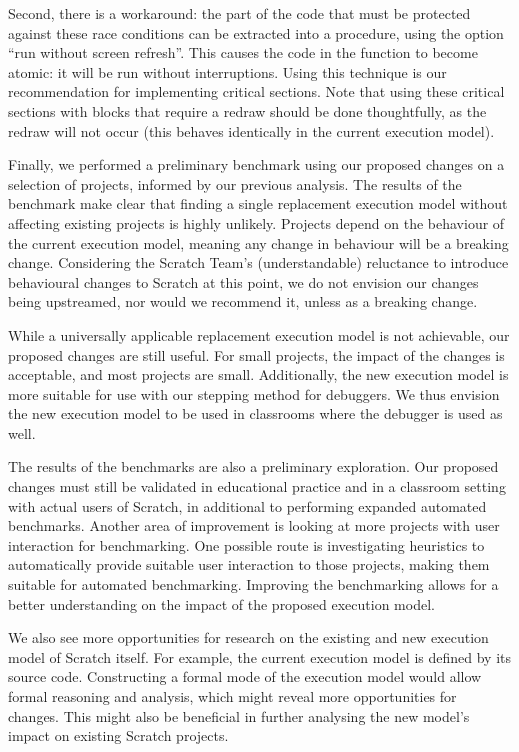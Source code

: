 \documentclass[../main]{subfiles}
\begin{document}
Second, there is a workaround: the part of the code that must be protected against these race conditions can be extracted into a procedure, using the option ``run without screen refresh''.
This causes the code in the function to become atomic: it will be run without interruptions.
Using this technique is our recommendation for implementing critical sections.
Note that using these critical sections with blocks that require a redraw should be done thoughtfully, as the redraw will not occur (this behaves identically in the current execution model).

Finally, we performed a preliminary benchmark using our proposed changes on a selection of projects, informed by our previous analysis.
The results of the benchmark make clear that finding a single replacement execution model without affecting existing projects is highly unlikely.
Projects depend on the behaviour of the current execution model, meaning any change in behaviour will be a breaking change.
Considering the Scratch Team's (understandable) reluctance to introduce behavioural changes to Scratch at this point, we do not envision our changes being upstreamed, nor would we recommend it,  unless as a breaking change.

While a universally applicable replacement execution model is not achievable, our proposed changes are still useful.
For small projects, the impact of the changes is acceptable, and most projects are small.
Additionally, the new execution model is more suitable for use with our stepping method for debuggers.
We thus envision the new execution model to be used in classrooms where the debugger is used as well.

The results of the benchmarks are also a preliminary exploration.
Our proposed changes must still be validated in educational practice and in a classroom setting with actual users of Scratch, in additional to performing expanded automated benchmarks.
Another area of improvement is looking at more projects with user interaction for benchmarking.
One possible route is investigating heuristics to automatically provide suitable user interaction to those projects, making them suitable for automated benchmarking.
Improving the benchmarking allows for a better understanding on the impact of the proposed execution model.

We also see more opportunities for research on the existing and new execution model of Scratch itself.
For example, the current execution model is defined by its source code.
Constructing a formal mode of the execution model would allow formal reasoning and analysis, which might reveal more opportunities for changes.
This might also be beneficial in further analysing the new model's impact on existing Scratch projects.
\end{document}

